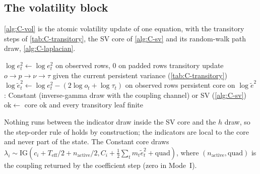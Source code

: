 \subsection{The volatility block}\label{app:alg-vol}

\cref{alg:C-vol} is the atomic volatility update of one equation, with the transitory steps of
\cref{tab:C-transitory}, the SV core of \cref{alg:C-sv} and its random-walk path draw,
\cref{alg:C-laplacian}.

\begin{algorithm}[!htbp]
\caption{The volatility block of one equation, transitory then persistent, atomic
(, ).}
\label{alg:C-vol}
\footnotesize
\begin{algorithmic}[1]
\State $\log e_t^2 \gets \log e_t^2$ on observed rows, $0$ on padded rows 
\State transitory update $o \to p \to \nu \to \tau$ given the current persistent variance (\cref{tab:C-transitory})
\State $\log\tilde e_t^2 \gets \log e_t^2 - (2\log o_t + \log\tau_t)$ on observed rows
\State persistent core on $\log\tilde e^2$: Constant (inverse-gamma draw with the coupling channel) or SV (\cref{alg:C-sv})
\State $\mathrm{ok} \gets$ core ok and every transitory leaf finite
\end{algorithmic}
\end{algorithm}

Nothing runs between the indicator draw inside the SV core and the $h$ draw, so the step-order rule
of \citet{delnegro2015time} holds by construction; the indicators are local to the core and never
part of the state.
The Constant core draws $\lambda_i \sim \mathrm{IG}(c_i + T_{\mathrm{eff}}/2 + n_{\mathrm{active}}/2,
C_i + \frac12\sum_t m_t\tilde e_t^2 + \mathrm{quad})$, where $(n_{\mathrm{active}}, \mathrm{quad})$
is the coupling returned by the coefficient step (zero in Mode~I).


